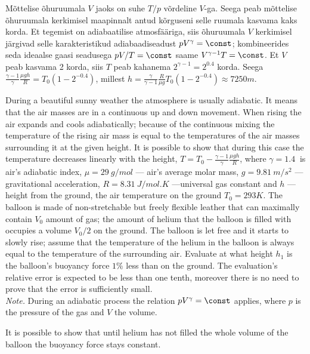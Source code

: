 {Mõttelise õhuruumala $V$ jaoks on suhe $T/p$ võrdeline $V$-ga. Seega peab mõttelise õhuruumala kerkimisel maapinnalt antud kõrguseni selle ruumala kasvama kaks korda. Et tegemist on adiabaatilise atmosfääriga, siis õhuruumala $V$ kerkimisel järgivad selle karakteristikud  adiabaadiseadust $pV^\gamma=\const$; kombineerides seda ideaalse gaasi seadusega $pV/T=\const$ saame $V^{\gamma-1}T=\const$. Et $V$ peab kasvama 2 korda, siis $T$ peab kahanema $2^{\gamma-1}=2^{0.4}$ korda. Seega $\frac{\gamma-1}\gamma\frac{\mu g h}R =T_0(1-2^{-0.4})$, millest $h=\frac\gamma{\gamma-1}\frac R{\mu g}T_0(1-2^{-0.4})\approx\SI{7250}m$.
\fi


\ifEngStatement
During a beautiful sunny weather the atmosphere is usually adiabatic. It means that the air masses are in a continuous up and down movement. When rising the air expands and cools adiabatically; because of the continuous mixing the temperature of the rising air mass is equal to the temperatures of the air masses surrounding it at the given height. It is possible to show that during this case the temperature decreases linearly with the height, $T=T_0-\frac{\gamma-1}\gamma\frac{\mu g h}R$, where $\gamma=\SI{1.4}{	}$ is air's adiabatic index, $\mu=\SI{29}{g/mol}$ — air's average molar mass, $g=\SI{9.81}{m/s^2}$ — gravitational acceleration, $R=\SI{8.31}{J/mol.K}$ —universal gas constant and $h$ — height from the ground, the air temperature on the ground $T_0=\SI{293}K$. The balloon is made of non-stretchable but freely flexible leather that can maximally contain $V_0$ amount of gas; the amount of helium that the balloon is filled with occupies a volume $V_0/2$ on the ground. The balloon is let free and it starts to slowly rise; assume that the temperature of the helium in the balloon is always equal to the temperature of the surrounding air. Evaluate at what height $h_1$ is the balloon's buoyancy force $1\%$ less than on the ground. The evaluation's relative error is expected to be less than one tenth, moreover there is no need to prove that the error is sufficiently small.\\
\emph{Note.}  During an adiabatic process the relation $pV^\gamma = \const$ applies, where $p$ is the pressure of the gas and $V$ the volume.
\fi


\ifEngHint
It is possible to show that until helium has not filled the whole volume of the balloon the buoyancy force stays constant.
\fi


}
